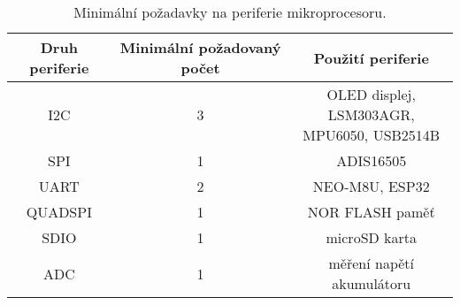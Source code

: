 \begin{table}[ht]
\caption{Minimální požadavky na periferie mikroprocesoru.} 
\centering
\begin{tabular}{|c|c|c|}
\hline 
Druh periferie & Minimální požadovaný počet & Použití periferie \\ 
\hline 
\hline 
I2C & 3 & \makecell{OLED displej, LSM303AGR, \\MPU6050, USB2514B}  \\ 
\hline 
SPI & 1 & ADIS16505 \\ 
\hline 
UART & 2 & NEO-M8U, ESP32 \\ 
\hline 
QUADSPI & 1 & NOR FLASH paměť \\ 
\hline 
SDIO & 1 & microSD karta \\ 
\hline 
ADC & 1 & měření napětí akumulátoru \\ 
\hline 
\end{tabular} 


\label{table:MCUperiferie}
\end{table} 
